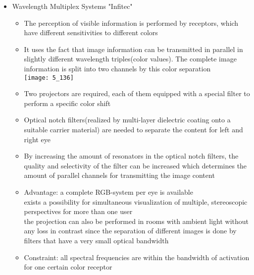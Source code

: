 \documentclass{standalone}
\begin{document}
\begin{itemize}
	\item Wavelength Multiplex Systems "Infitec"
	\begin{itemize}
		\item The perception of visible information is performed by receptors, which have different sensitivities to different colors
		\item It uses the fact that image information can be transmitted in parallel in slightly different wavelength triples(color values). The complete image information is split into two channels by this color separation \\
		\texttt{[image: 5\_136]}
		\item Two projectors are required, each of them equipped with a special filter to perform a specific color shift
		\item Optical notch filters(realized by multi-layer dielectric coating onto a suitable carrier material) are needed to separate the content for left and right eye
		\item By increasing the amount of resonators in the optical notch filters, the quality and selectivity of the filter can be increased which determines the amount of parallel channels for transmitting the image content
		\item Advantage: a complete RGB-system per eye is available \\
		exists a possibility for simultaneous visualization of multiple, stereoscopic perspectives for more than one user \\
		the projection can also be performed in rooms with ambient light without any loss in contrast since the separation of different images is done by filters that have a very small optical bandwidth
		\item Constraint: all spectral frequencies are within the bandwidth of activation for one certain color receptor
	\end{itemize}		
	
\end{itemize}
\end{document}
